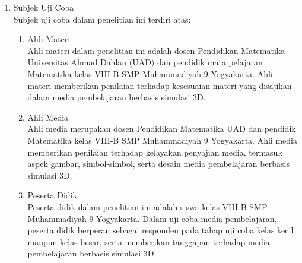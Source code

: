 \begin{enumerate}
    \item Subjek Uji Coba\\
    \hspace*{1cm}Subjek uji coba dalam penelitian ini terdiri atas:
    \begin{enumerate}
        \item Ahli Materi\\
        Ahli materi dalam penelitian ini adalah dosen Pendidikan Matematika Universitas Ahmad Dahlan (UAD) dan pendidik mata pelajaran Matematika kelas VIII-B SMP Muhammadiyah 9 Yogyakarta. Ahli materi memberikan penilaian terhadap kesesuaian materi yang disajikan dalam media pembelajaran berbasis simulasi 3D.
        \item Ahli Media\\
        Ahli media merupakan dosen Pendidikan Matematika UAD dan pendidik Matematika kelas VIII-B SMP Muhammadiyah 9 Yogyakarta. Ahli media memberikan penilaian terhadap kelayakan penyajian media, termasuk aspek gambar, simbol-simbol, serta desain media pembelajaran berbasis simulasi 3D.
        \item Peserta Didik\\
        Peserta didik dalam penelitian ini adalah siswa kelas VIII-B SMP Muhammadiyah 9 Yogyakarta. Dalam uji coba media pembelajaran, peserta didik berperan sebagai responden pada tahap uji coba kelas kecil maupun kelas besar, serta memberikan tanggapan terhadap media pembelajaran berbasis simulasi 3D.
    \end{enumerate}


\end{enumerate}
